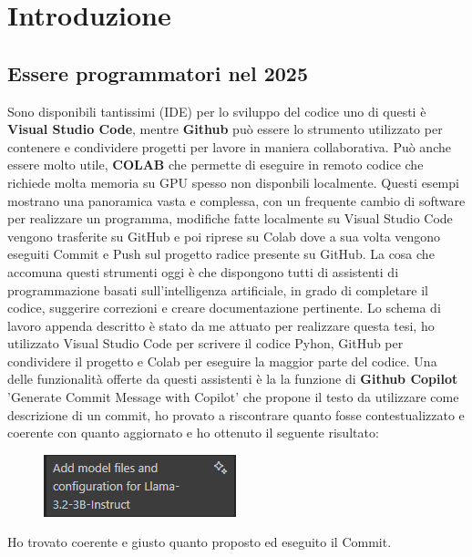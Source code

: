\documentclass[12pt,a4paper,openright,twoside]{book}
\begin{document}
\chapter{Introduzione}
\label{chap:introduction}

\section{Essere programmatori nel 2025}
Sono disponibili tantissimi (IDE) per lo sviluppo del codice uno di questi è \textbf{Visual Studio Code}, mentre \textbf{Github} può essere lo strumento utilizzato per contenere e condividere progetti per lavore in maniera collaborativa. Può anche essere molto utile, \textbf{COLAB} che permette di eseguire in remoto codice che richiede molta memoria su GPU spesso non disponbili localmente.
Questi esempi mostrano una panoramica vasta e complessa, con un frequente cambio di software per realizzare un programma, modifiche fatte localmente su Visual Studio Code vengono trasferite su GitHub e poi riprese su Colab dove a sua volta vengono eseguiti Commit e Push sul progetto radice presente su GitHub.
La cosa che accomuna questi strumenti oggi è che dispongono tutti di assistenti di programmazione basati sull'intelligenza artificiale, in grado di completare il codice, suggerire correzioni e creare documentazione pertinente.
Lo schema di lavoro appenda descritto è stato da me attuato per realizzare questa tesi, ho utilizzato Visual Studio Code per scrivere il codice Pyhon, GitHub per condividere il progetto e Colab per eseguire la maggior parte del codice.
Una delle funzionalità offerte da questi assistenti è la la funzione di \textbf{Github Copilot} 'Generate Commit Message with Copilot' che propone il testo da utilizzare come descrizione di un commit, ho provato a riscontrare quanto fosse contestualizzato e coerente 
con quanto aggiornato e ho ottenuto il seguente risultato:
\begin{figure}[h]
    \centering
    \includegraphics[width=0.5\linewidth]{figures/commit.png}
    \label{fig:enter-label}
\end{figure}
\newline
Ho trovato coerente e giusto quanto proposto ed eseguito il Commit.
\end{document}
